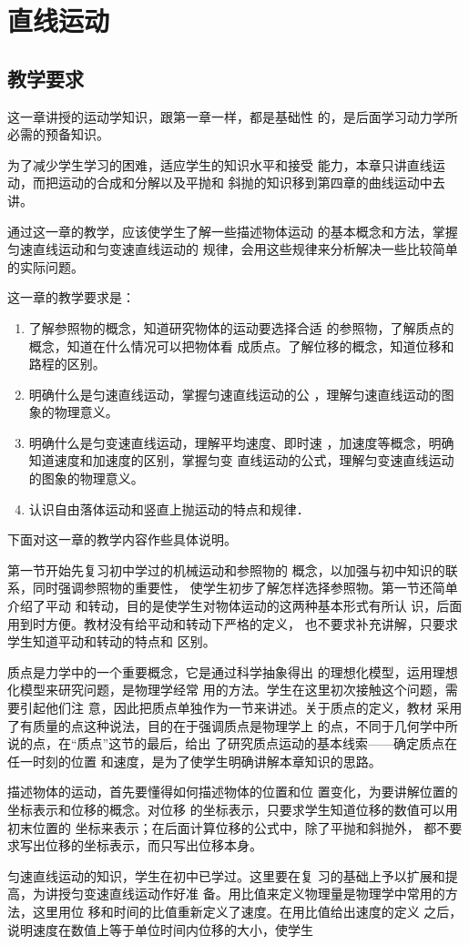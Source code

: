 \chapter{直线运动}
\section{教学要求}
这一章讲授的运动学知识，跟第一章一样，都是基础性
的，是后面学习动力学所必需的预备知识。

为了减少学生学习的困难，适应学生的知识水平和接受
能力，本章只讲直线运动，而把运动的合成和分解以及平抛和
斜抛的知识移到第四章的曲线运动中去讲。

通过这一章的教学，应该使学生了解一些描述物体运动
的基本概念和方法，掌握匀速直线运动和匀变速直线运动的
规律，会用这些规律来分析解决一些比较简单的实际问题。

这一章的教学要求是：
\begin{enumerate}
\item 了解参照物的概念，知道研究物体的运动要选择合适
的参照物，了解质点的概念，知道在什么情况可以把物体看
成质点。了解位移的概念，知道位移和路程的区别。
\item 明确什么是匀速直线运动，掌握匀速直线运动的公
，理解匀速直线运动的图象的物理意义。
\item 明确什么是匀变速直线运动，理解平均速度、即时速
，加速度等概念，明确知道速度和加速度的区别，掌握匀变
直线运动的公式，理解匀变速直线运动的图象的物理意义。
\item 认识自由落体运动和竖直上抛运动的特点和规律．
\end{enumerate}

下面对这一章的教学内容作些具体说明。

第一节开始先复习初中学过的机械运动和参照物的
概念，以加强与初中知识的联系，同时强调参照物的重要性，
使学生初步了解怎样选择参照物。第一节还简单介绍了平动
和转动，目的是使学生对物体运动的这两种基本形式有所认
识，后面用到时方便。教材没有给平动和转动下严格的定义，
也不要求补充讲解，只要求学生知道平动和转动的特点和
区别。

质点是力学中的一个重要概念，它是通过科学抽象得出
的理想化模型，运用理想化模型来研究问题，是物理学经常
用的方法。学生在这里初次接触这个问题，需要引起他们注
意，因此把质点单独作为一节来讲述。关于质点的定义，教材
采用了有质量的点这种说法，目的在于强调质点是物理学上
的点，不同于几何学中所说的点，在“质点”这节的最后，给出
了研究质点运动的基本线索——确定质点在任一时刻的位置
和速度，是为了使学生明确讲解本章知识的思路。

描述物体的运动，首先要懂得如何描述物体的位置和位
置变化，为要讲解位置的坐标表示和位移的概念。对位移
的坐标表示，只要求学生知道位移的数值可以用初末位置的
坐标来表示；在后面计算位移的公式中，除了平抛和斜抛外，
都不要求写出位移的坐标表示，而只写出位移本身。

匀速直线运动的知识，学生在初中已学过。这里要在复
习的基础上予以扩展和提高，为讲授匀变速直线运动作好准
备。用比值来定义物理量是物理学中常用的方法，这里用位
移和时间的比值重新定义了速度。在用比值给出速度的定义
之后，说明速度在数值上等于单位时间内位移的大小，使学生
